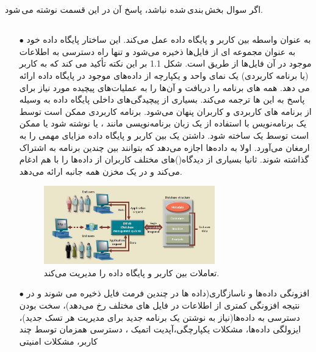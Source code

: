 \documentclass{article}
\begin{document}


\newpage

\section{}
اگر سوال بخش\,بندی\,شده نباشد، پاسخ آن در این قسمت نوشته می\,شود.
\subsection{}
\begin{itemize}
    \item [$\bullet$]
    به عنوان واسطه بین کاربر و پایگاه داده عمل می‌کند. این ساختار پایگاه داده خود به عنوان مجموعه ای از فایل‌ها ذخیره می‌شود و تنها راه دسترسی به اطلاعات موجود در آن فایل‌ها از طریق 
است.
شکل 1.1 بر این نکته تأکید می کند که
به کاربر (یا برنامه کاربردی) یک نمای واحد و یکپارچه از داده‌های موجود در پایگاه داده ارائه می دهد.
همه 
‌های برنامه را دریافت و آن‌ها را به عملیات‌های پیچیده مورد نیاز برای پاسخ به 
این
‌ها
ترجمه می‌کند.
بسیاری از پیچیدگی‌های داخلی پایگاه داده به وسیله 
از برنامه های کاربردی و کاربران پنهان می‌شود.
برنامه کاربردی ممکن است توسط یک برنامه‌نویس با استفاده از یک زبان برنامه‌نویسی مانند 
	، 
یا
نوشته شود یا ممکن است توسط یک
ساخته شود.
داشتن یک
بین
کاربر و پایگاه داده مزایای مهمی را به ارمغان می‌آورد. اولا
به داده‌ها اجازه می‌دهد که بتوانند بین چندین برنامه به اشتراک گذاشته شوند. ثانیا
بسیاری از دیدگاه()های مختلف کاربران از داده‌ها را با هم ادغام می‌کند و در یک مخزن همه جانبه ارائه می‌دهد.
\begin{figure}[ht]
    \centering
    \includegraphics[width=0.7\textwidth]{figures/1.1.png}
    \caption
	{
تعاملات بین کاربر و پایگاه داده را مدیریت می‌کند.
	}
    \label{fig:fig1}
\end{figure}


    \item [$\bullet$]
افزونگی داده‌ها و ناسازگاری(داده ها در چندین فرمت فایل ذخیره می شوند و در نتیجه افزونگی کمتری از اطلاعات در فایل های مختلف رخ می‌دهد)، سخت بودن دسترسی به داده‌ها(نیاز به نوشتن یک برنامه جدید برای مدیریت هر تسک جدید)، ایزولگی داده‌ها، مشکلات یکپارچگی،آپدیت اتمیک ، دسترسی همزمان توسط چند کاربر، مشکلات امنیتی
\end{itemize}
\end{document}
